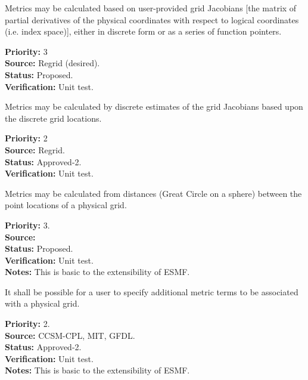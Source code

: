 Metrics may be calculated based on user-provided grid Jacobians [the matrix of
partial derivatives of the physical coordinates with respect to logical
coordinates (i.e. index space)], either in discrete form or as a series of function pointers.
\begin{reqlist}
{\bf Priority:} 3 \\
{\bf Source:} Regrid (desired). \\
{\bf Status:} Proposed. \\
{\bf Verification:} Unit test. 
\end{reqlist}

Metrics may be calculated by discrete estimates of the grid Jacobians based upon
the discrete grid locations.
\begin{reqlist}
{\bf Priority:} 2 \\
{\bf Source:} Regrid. \\
{\bf Status:} Approved-2. \\
{\bf Verification:} Unit test.
\end{reqlist}

Metrics may be calculated from distances (Great Circle on a sphere) between
the point locations of a physical grid.
\begin{reqlist}
{\bf Priority:} 3. \\
{\bf Source:} \\
{\bf Status:} Proposed. \\
{\bf Verification:} Unit test. \\
{\bf Notes:} This is basic to the extensibility of ESMF. 
\end{reqlist}

It shall be possible for a user to specify additional metric terms to be associated
with a physical grid.
\begin{reqlist}
{\bf Priority:} 2. \\
{\bf Source:} CCSM-CPL, MIT, GFDL. \\
{\bf Status:} Approved-2. \\
{\bf Verification:} Unit test. \\
{\bf Notes:} This is basic to the extensibility of ESMF. 
\end{reqlist}



